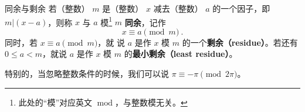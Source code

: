 
\begin{definition}{同余与剩余}
若（整数） $m$ 是（整数） $x$ 减去（整数） $a$ 的一个因子，即 $m | (x-a)$，则称 $x$ 与 $a$ 模\footnote{此处的“模”对应英文 $\operatorname{mod}$，与整数模无关。} $m$ \textbf{同余}，记作
\begin{equation}
x \equiv a \pmod m ~.
\end{equation}
同时，若 $x \equiv a \pmod m$，就 说 $a$ 是作 $x$ 模 $m$ 的一个\textbf{剩余（residue）}。若还有 $0 \le a < m$，就说 $a$ 是作 $x$ 模 $m$ 的\textbf{最小剩余（least residue）}。
\end{definition}
特别的，当忽略整数条件的时候，我们可以说 $\pi \equiv -\pi \pmod{2\pi}$。



